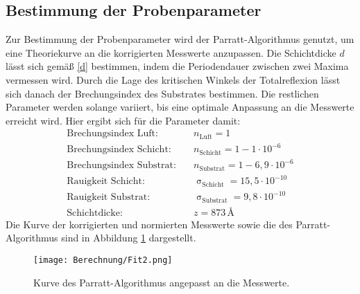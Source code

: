 \subsection{Bestimmung der Probenparameter}
Zur Bestimmung der Probenparameter wird der Parratt-Algorithmus genutzt, um eine Theoriekurve an die  korrigierten Messwerte anzupassen. Die Schichtdicke $d$ lässt sich gemäß \eqref{d} bestimmen, indem die Periodendauer zwischen zwei Maxima vermessen wird. Durch die Lage des kritischen Winkels der Totalreflexion lässt sich danach der Brechungsindex des Substrates bestimmen. Die restlichen Parameter werden solange variiert, bis eine optimale Anpassung an die Messwerte erreicht wird. Hier ergibt sich für die Parameter damit:
\begin{align}
  \text{Brechungsindex Luft}:&\quad n_\text{Luft}=1 \nonumber\\
  \text{Brechungsindex Schicht}:&\quad n_\text{Schicht}= 1-1\cdot10^{-6} \nonumber\\
  \text{Brechungsindex Substrat}:&\quad n_\text{Substrat}=1-6,9\cdot10^{-6} \nonumber\\
  \text{Rauigkeit Schicht}:&\quad \upsigma_\text{Schicht}=15,5\cdot10^{-10} \nonumber\\
  \text{Rauigkeit Substrat}:&\quad \upsigma_\text{Substrat}=9,8\cdot10^{-10} \nonumber\\
  \text{Schichtdicke}:&\quad z=873\,\si{\angstrom}\nonumber
\end{align}
Die Kurve der korrigierten und normierten Messwerte sowie die des Parratt-Algorithmus sind in Abbildung \ref{fit} dargestellt.
\begin{figure}[H]
  \centering
  \texttt{[image: Berechnung/Fit2.png]}
  \caption{Kurve des Parratt-Algorithmus angepasst an die Messwerte.}
  \label{fit}
\end{figure}
